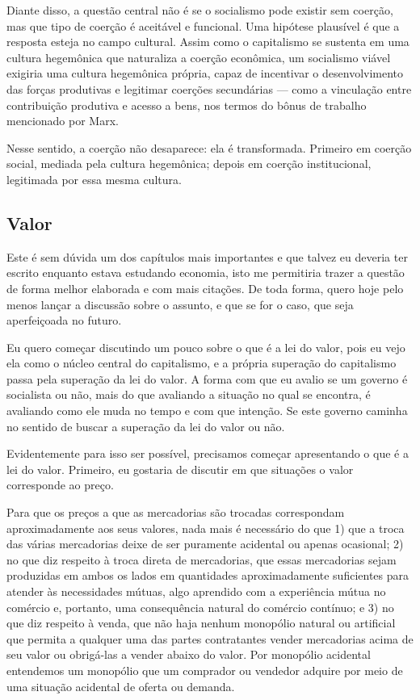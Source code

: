 Diante disso, a questão central não é se o socialismo pode existir sem coerção, mas que tipo de coerção é aceitável e funcional. Uma hipótese plausível é que a resposta esteja no campo cultural. Assim como o capitalismo se sustenta em uma cultura hegemônica que naturaliza a coerção econômica, um socialismo viável exigiria uma cultura hegemônica própria, capaz de incentivar o desenvolvimento das forças produtivas e legitimar coerções secundárias — como a vinculação entre contribuição produtiva e acesso a bens, nos termos do bônus de trabalho mencionado por Marx.

Nesse sentido, a coerção não desaparece: ela é transformada. Primeiro em coerção social, mediada pela cultura hegemônica; depois em coerção institucional, legitimada por essa mesma cultura. 

\subsection{Valor}

Este é sem dúvida um dos capítulos mais importantes e que talvez eu deveria ter escrito enquanto estava estudando economia, isto me permitiria trazer a questão de forma melhor elaborada e com mais citações. De toda forma, quero hoje pelo menos lançar a discussão sobre o assunto, e que se for o caso, que seja aperfeiçoada no futuro.

Eu quero começar discutindo um pouco sobre o que é a lei do valor, pois eu vejo ela como o núcleo central do capitalismo, e a própria superação do capitalismo passa pela superação da lei do valor. A forma com que eu avalio se um governo é socialista ou não, mais do que avaliando a situação no qual se encontra, é avaliando como ele muda no tempo e com que intenção. Se este governo caminha no sentido de buscar a superação da lei do valor ou não.

Evidentemente para isso ser possível, precisamos começar apresentando o que é a lei do valor. Primeiro, eu gostaria de discutir em que situações o valor corresponde ao preço.

Para que os preços a que as mercadorias são trocadas correspondam aproximadamente aos seus valores, nada mais é necessário do que 1) que a troca das várias mercadorias deixe de ser puramente acidental ou apenas ocasional; 2) no que diz respeito à troca direta de mercadorias, que essas mercadorias sejam produzidas em ambos os lados em quantidades aproximadamente suficientes para atender às necessidades mútuas, algo aprendido com a experiência mútua no comércio e, portanto, uma consequência natural do comércio contínuo; e 3) no que diz respeito à venda, que não haja nenhum monopólio natural ou artificial que permita a qualquer uma das partes contratantes vender mercadorias acima de seu valor ou obrigá-las a vender abaixo do valor. Por monopólio acidental entendemos um monopólio que um comprador ou vendedor adquire por meio de uma situação acidental de oferta ou demanda.

